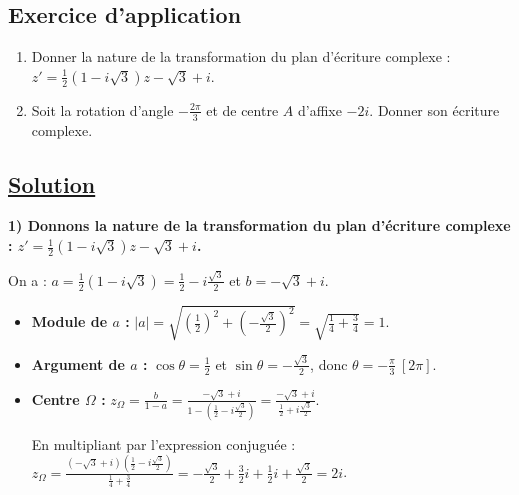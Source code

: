\documentclass[12pt,a4paper]{article}
\begin{document}
\subsection*{Exercice d'application}

\begin{enumerate}
    \item Donner la nature de la transformation du plan d'écriture complexe : \(z' = \frac{1}{2}(1 - i\sqrt{3}) z - \sqrt{3} + i\).
    \item Soit la rotation d'angle \(-\frac{2\pi}{3}\) et de centre \(A\) d'affixe \(-2i\). Donner son écriture complexe.
\end{enumerate}

\subsection*{ \underline{Solution}}

\textbf{1) Donnons la nature de la transformation du plan d'écriture complexe : \(z' = \frac{1}{2}(1 - i\sqrt{3}) z - \sqrt{3} + i\).}

On a : \(a = \frac{1}{2}(1 - i\sqrt{3}) = \frac{1}{2} - i\frac{\sqrt{3}}{2}\) et \(b = -\sqrt{3} + i\).

\begin{itemize}
    \item \textbf{Module de \(a\) :} \(|a| = \sqrt{\left(\frac{1}{2}\right)^2 + \left(-\frac{\sqrt{3}}{2}\right)^2} = \sqrt{\frac{1}{4} + \frac{3}{4}} = 1\).
    \item \textbf{Argument de \(a\) :} \(\cos \theta = \frac{1}{2}\) et \(\sin \theta = -\frac{\sqrt{3}}{2}\), donc \(\theta = -\frac{\pi}{3} \ [2\pi]\).
    \item \textbf{Centre \(\Omega\) :} \(z_{\Omega} = \frac{b}{1 - a} = \frac{-\sqrt{3} + i}{1 - (\frac{1}{2} - i\frac{\sqrt{3}}{2})} = \frac{-\sqrt{3} + i}{\frac{1}{2} + i\frac{\sqrt{3}}{2}}\).
    
    En multipliant par l'expression conjuguée :
    \(z_{\Omega} = \frac{(-\sqrt{3} + i)(\frac{1}{2} - i\frac{\sqrt{3}}{2})}{\frac{1}{4} + \frac{3}{4}} = -\frac{\sqrt{3}}{2} + \frac{3}{2}i + \frac{1}{2}i + \frac{\sqrt{3}}{2} = 2i\).
\end{itemize}

\begin{center}
\end{center}
\end{document}
